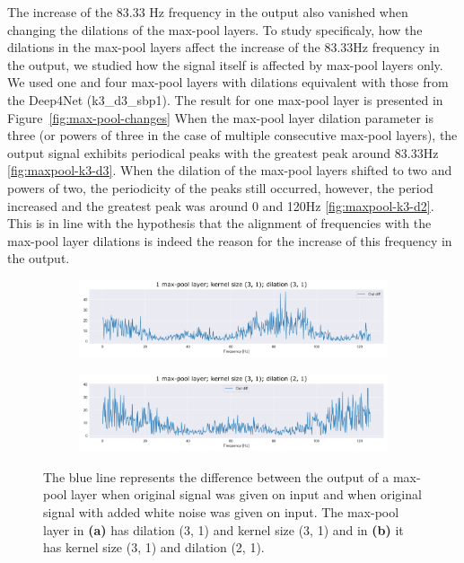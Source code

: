 The increase of the 83.33 Hz frequency in the output also vanished when changing the dilations of the max-pool layers.
To study specificaly, how the dilations in the max-pool layers affect the increase of the 83.33Hz frequency in the output, we studied how the signal itself is affected by max-pool layers only.
We used one and four max-pool layers with dilations equivalent with those from the Deep4Net (k3\_d3\_sbp1).
The result for one max-pool layer is presented in Figure~\ref{fig:max-pool-changes}
When the max-pool layer dilation parameter is three (or powers of three in the case of multiple consecutive max-pool layers), the output signal exhibits periodical peaks with the greatest peak around 83.33Hz \ref{fig:maxpool-k3-d3}.
When the dilation of the max-pool layers shifted to two and powers of two, the periodicity of the peaks still occurred, however, the period increased and the greatest peak was around 0 and 120Hz \ref{fig:maxpool-k3-d2}.
This is in line with the hypothesis that the alignment of frequencies with the max-pool layer dilations is indeed the reason for the increase of this frequency in the output.


\begin{figure}
\centering
\begin{subfigure}[b]{\textwidth}
   \includegraphics[width=1\linewidth]{img/ch4/absVel-maxpool-k3-d3}
   \caption{}
   \label{fig:Ng1} 
\end{subfigure}

\begin{subfigure}[b]{\textwidth}
   \includegraphics[width=1\linewidth]{img/ch4/absVel-maxpool-k3-d2}
   \caption{}
   \label{fig:Ng2}
\end{subfigure}

\caption[]{The blue line represents the difference between the output of a max-pool layer when original signal was given on input and when original signal with added white noise was given on input. The max-pool layer in \textbf{(a)} has dilation (3, 1) and kernel size (3, 1) and in \textbf{(b)} it has kernel size (3, 1) and dilation (2, 1).} 
\end{figure}\label{fig:max-pool-changes}

